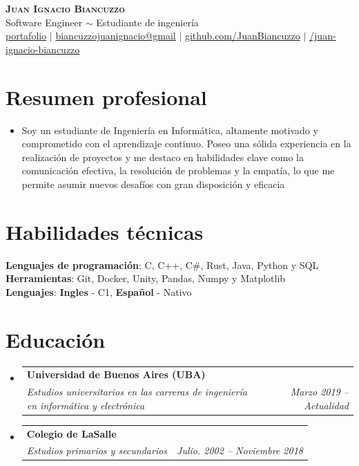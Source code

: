 \documentclass[letterpaper,11pt]{article}
\makeatletter
\newcommand{\resumeSubheading}[4]{
  \vspace{-2pt}\item
    \begin{tabular*}{0.97\textwidth}[t]{l@{\extracolsep{\fill}}r}
      \textbf{#1} & #2 \\
      \textit{\small#3} & \textit{\small #4} \\
    \end{tabular*}\vspace{-7pt}
}
\newcommand{\resumeSubHeadingListStart}{\begin{itemize}[leftmargin=0.15in, label={}]}
\newcommand{\resumeSubHeadingListEnd}{\end{itemize}}
\makeatother
\begin{document}
\begin{center}
    \textbf{\Huge \scshape Juan Ignacio Biancuzzo} \\ \vspace{1pt} 
    { \Large Software Engineer $\sim$ Estudiante de ingeniería } \\

    { \small
        \faGlobe \href{https://juanbiancuzzo.github.io/JuanBiancuzzo/}{ portafolio} $|$
        \faEnvelope \href{mailto:biancuzzojuanignacio@gmail.com}{ biancuzzojuanignacio@gmail} $|$
        \faGithub \href{https://github.com/JuanBiancuzzo}{ github.com/JuanBiancuzzo} $|$
        \faLinkedinSquare \href{https://www.linkedin.com/in/juan-ignacio-biancuzzo-367611231/}{/juan-ignacio-biancuzzo}
    }
    
\end{center}

\section{Resumen profesional}
    \resumeSubHeadingListStart
        \vspace{-2pt}\item Soy un estudiante de Ingeniería en Informática, altamente motivado y comprometido con el aprendizaje continuo. Poseo una sólida experiencia en la realización de proyectos y me destaco en habilidades clave como la comunicación efectiva, la resolución de problemas y la empatía, lo que me permite asumir nuevos desafíos con gran disposición y eficacia
    \resumeSubHeadingListEnd

\section{Habilidades técnicas}
 \begin{itemize}[leftmargin=0.15in, label={}]
    \small{\item{
     \textbf{Lenguajes de programación}{: C, C++, C\#, Rust, Java, Python y SQL} \\
     \textbf{Herramientas}{: Git, Docker, Unity, Pandas, Numpy y Matplotlib} \\
     \textbf{Lenguajes}{: \textbf{Ingles} - C1, \textbf{ Español} - Nativo} \\
    }}
 \end{itemize}

\section{Educación}
  \resumeSubHeadingListStart
    \resumeSubheading
      {Universidad de Buenos Aires (UBA)}{}
      {Estudios universitarios en las carreras de ingeniería en informática y electrónica}{Marzo 2019 -- Actualidad}
    \resumeSubheading
      {Colegio de LaSalle}{}
      {Estudios primarios y secundarios}{Julio. 2002 -- Noviembre 2018}
  \resumeSubHeadingListEnd
\end{document}
